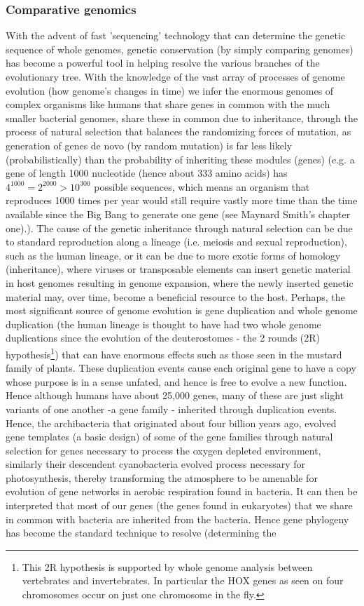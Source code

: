 \subsubsection*{Comparative genomics}
With the advent of fast 'sequencing' technology that can determine the genetic sequence of whole genomes, genetic conservation (by simply comparing genomes) has become a powerful tool in helping resolve the various branches of the evolutionary tree.  With the knowledge of the vast array of processes of genome evolution (how genome's changes in time) we infer the enormous genomes of complex organisms like humans that share genes in common with the much smaller bacterial genomes, share these in common due to inheritance, through the process of natural selection that balances the randomizing forces of mutation, as generation of genes de novo (by random mutation) is far less likely (probabilistically) than the probability of inheriting these modules (genes) (e.g. a gene of length 1000 nucleotide (hence about 333 amino acids) has $4^{1000}=2^{2000} > 10^{300}$ possible sequences, which means an organism that reproduces 1000 times per year would still require vastly more time than the time available since the Big Bang to generate one gene (see Maynard Smith's chapter one\cite{maynard}).).  The cause of the genetic inheritance through natural selection can be due to standard reproduction along a lineage (i.e. meiosis and sexual reproduction), such as the human lineage, or it can be due to more exotic forms of homology (inheritance), where viruses or transposable elements can insert genetic material in host genomes resulting in genome expansion, where the newly inserted genetic material may, over time, become a beneficial resource to the host.  Perhaps, the most significant source of genome evolution is gene duplication and whole genome duplication (the human lineage is thought to have had two whole genome duplications since the evolution of the deuterostomes - the 2 rounds (2R) hypothesis\footnote{This 2R hypothesis is supported by whole genome analysis between vertebrates and invertebrates.  In particular the HOX genes as seen on four chromosomes occur on just one chromosome in the fly.}) that can have enormous effects such as those seen in the mustard family of plants.  These duplication events cause each original gene to have a copy whose purpose is in a sense unfated, and hence is free to evolve a new function.  Hence although humans have about 25,000 genes, many of these are just slight variants of one another -a gene family - inherited through duplication events.  Hence, the archibacteria that originated about four billion years ago, evolved gene templates (a basic design) of some of the gene families through natural selection for genes necessary to process the oxygen depleted environment, similarly their descendent cyanobacteria evolved process necessary for photosynthesis, thereby transforming the atmosphere to be amenable for evolution of gene networks in aerobic respiration found in bacteria.  It can then be interpreted that most of our genes (the genes found in eukaryotes) that we share in common with bacteria are inherited from the bacteria.  Hence gene phylogeny has become the standard technique to resolve (determining the 